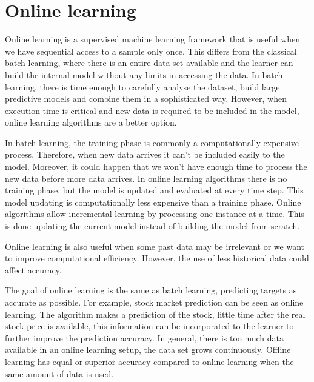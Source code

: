 \newpage
\section{Online learning} \label{sec:onoffline}

Online learning is a supervised machine learning framework that is useful when
we have sequential access to a sample only once.  This differs from the
classical batch learning, where there is an entire data set available and the
learner can build the internal model without any limits in accessing the data.
In batch learning, there is time enough to carefully analyse the dataset, build
large predictive models and combine them in a sophisticated way. However, when
execution time is critical and new data is required to be included in the model,
online learning algorithms are a better option.

In batch learning, the training phase is commonly a computationally expensive
process. Therefore, when new data arrives it can't be included easily to the
model. Moreover, it could happen that we won't have enough time to process the
new data before more data arrives. In online learning algorithms there is no
training phase, but the model is updated and evaluated at every time step. This
model updating is computationally less expensive than a training phase.
Online algorithms allow incremental learning by processing one instance at a
time. This is done updating the current model instead of building the model from
scratch.

Online learning is also useful when some past data may be irrelevant
or we want to improve computational efficiency. However, the use of less
historical data could affect accuracy.

The goal of online learning is the same as batch learning, predicting targets as
accurate as possible. For example, stock market prediction can be seen as online
learning. The algorithm makes a prediction of the stock, little time after the
real stock price is available, this information can be incorporated to the
learner to further improve the prediction accuracy. In general, there is too
much data available in an online learning setup, the data set grows
continuously. Offline learning has equal or superior accuracy compared to online
learning when the same amount of data is used.

